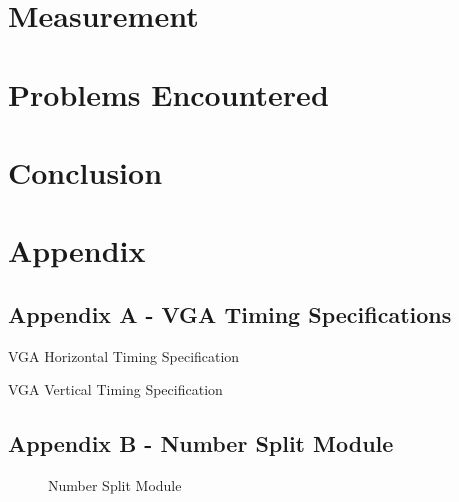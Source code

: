 \documentclass[a4paper,12pt]{article}
\begin{document}
\section{Measurement}
\newpage
\section{Problems Encountered}
\newpage
\section{Conclusion}
\newpage
\section{Appendix}
\subsection{Appendix A - VGA Timing Specifications}
\begin{flushleft}
\begin{table}[H]
	\centering
	\caption{VGA Horizontal Timing Specification \cite{terasic_2014}}
\end{table}
\begin{table}[H]
	\centering
	\caption{VGA Vertical Timing Specification \cite{terasic_2014}}
\end{table}
\end{flushleft}
\newpage
{}
\begin{flushleft}
\subsection{Appendix B - Number Split Module}
\begin{figure}[H]
	\centering
	
		\caption{Number Split Module}
\end{figure}
\newpage

\end{flushleft}
\end{document}
